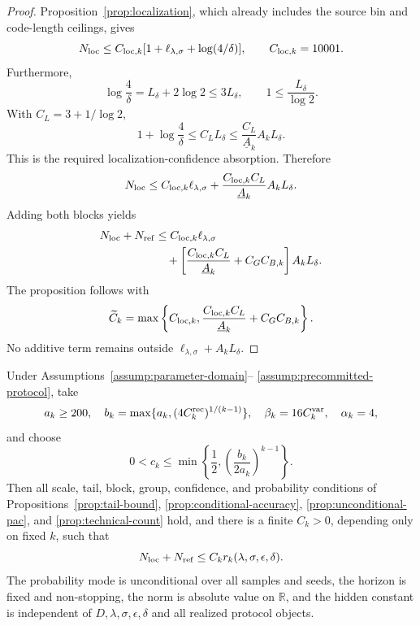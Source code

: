 \begin{proof}
Proposition~\ref{prop:localization}, which already includes the source bin
and code-length ceilings, gives
\[
 N_{\rm loc}\leq C_{{\rm loc},k}
 [1+\ell_{\lambda,\sigma}+\log(4/\delta)],
 \qquad C_{{\rm loc},k}=10001.
\]
Furthermore,
\[
 \log\frac4\delta=L_\delta+2\log2\leq3L_\delta,
 \qquad 1\leq\frac{L_\delta}{\log2}.
\]
With $C_L=3+1/\log2$,
\[
 1+\log\frac4\delta
 \leq C_LL_\delta
 \leq\frac{C_L}{\underline A_k}A_kL_\delta.
\]
This is the required localization-confidence absorption.  Therefore
\[
 N_{\rm loc}\leq C_{{\rm loc},k}\ell_{\lambda,\sigma}
 +\frac{C_{{\rm loc},k}C_L}{\underline A_k}A_kL_\delta.
\]
Adding both blocks yields
\[
\begin{aligned}
 N_{\rm loc}+N_{\rm ref}
 &\leq C_{{\rm loc},k}\ell_{\lambda,\sigma}\\
 &\quad+\left[
 \frac{C_{{\rm loc},k}C_L}{\underline A_k}+C_GC_{B,k}
 \right]A_kL_\delta.
\end{aligned}
\]
The proposition follows with
\[
 \widetilde C_k=\max\left\{C_{{\rm loc},k},
 \frac{C_{{\rm loc},k}C_L}{\underline A_k}+C_GC_{B,k}\right\}.
\]
No additive term remains outside
$\ell_{\lambda,\sigma}+A_kL_\delta$.
\end{proof}

\begin{proposition}
\label{prop:rate-specialization-bridge}
Under Assumptions~\ref{assump:parameter-domain}--
\ref{assump:precommitted-protocol}, take
\[
 a_k\geq200,
 \quad b_k=\max\{a_k,(4C_k^{\rm rec})^{1/(k-1)}\},
 \quad \beta_k=16C_k^{\rm var},
 \quad \alpha_k=4,
\]
and choose
\[
 0<c_k\leq\min\left\{\frac12,
 \left(\frac{b_k}{2a_k}\right)^{k-1}\right\}.
\]
Then all scale, tail, block, group, confidence, and probability conditions
of Propositions~\ref{prop:tail-bound}, \ref{prop:conditional-accuracy},
\ref{prop:unconditional-pac}, and \ref{prop:technical-count} hold, and there
is a finite $C_k>0$, depending only on fixed $k$, such that
\[
 N_{\rm loc}+N_{\rm ref}
 \leq C_kr_k(\lambda,\sigma,\epsilon,\delta).
\]
The probability mode is unconditional over all samples and seeds, the horizon
is fixed and non-stopping, the norm is absolute value on $\mathbb R$, and the
hidden constant is independent of $D,\lambda,\sigma,\epsilon,\delta$ and all
realized protocol objects.
\end{proposition}

